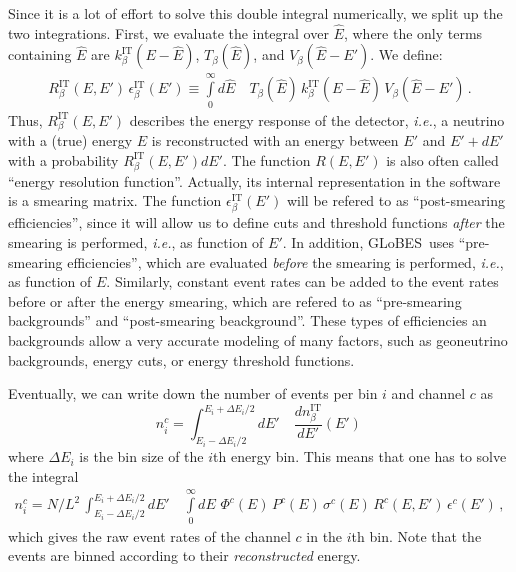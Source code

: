 \documentclass[12pt,a4paper]{article}
\newcommand{\ie}{{\it i.e.}}
\newcommand{\GLOBES}{{\sf GLoBES}}
\begin{document}
Since it is a lot of effort to solve this double integral numerically,
we split up the two integrations. First, we evaluate the integral over
$\hat{E}$, where the only terms containing $\hat{E}$ are
$k_\beta^{\text{IT}}(E-\hat{E})$,  $ T_\beta(\hat{E})$, and 
$ V_\beta(\hat{E}-E')$. We define:
\begin{eqnarray}
\label{equ:e_res} 
R_\beta^{\text{IT}}(E,E')\,\epsilon_\beta^{\text{IT}}(E')
 \equiv
\int\limits_0^\infty d\hat{E} \quad T_\beta(\hat{E})\,k_\beta^{\text{IT}}(E-\hat{E})
\,V_\beta(\hat{E}-E')\,. 
\end{eqnarray}
Thus, $R_\beta^{\text{IT}}(E,E')$ describes the energy response of 
the detector, \ie , a neutrino with a (true) energy $E$ is reconstructed
with an energy between $E'$ and $E'+dE'$ with a probability
$R_\beta^{\text{IT}}(E,E') dE'$. The function $R(E,E')$ is also often called ``energy resolution function''. Actually, its internal representation
in the software is a smearing matrix. The function $\epsilon_\beta^{\text{IT}}(E')$ will be refered to as ``post-smearing efficiencies'', since it will allow us to define cuts and threshold functions {\em after} the smearing is performed, \ie, as function of $E'$. 
In addition, \GLOBES\ uses ``pre-smearing efficiencies'', which are 
evaluated {\em before} the smearing is performed, \ie, as function of $E$.
Similarly, constant event rates can be added to the event rates before or after the energy smearing, which are refered to as ``pre-smearing backgrounds'' and ``post-smearing beackground''. These types of 
efficiencies an backgrounds allow a very accurate modeling of
many factors, such as geoneutrino backgrounds, energy cuts, or
energy threshold functions.

Eventually, we can write down the number of events per bin $i$  and channel $c$ as
\begin{equation}
\label{equ:channel}
n_i^c=\int_{E_i-\Delta E_i/2}^{E_i+\Delta E_i/2} dE' \quad
\frac{dn_{\beta}^{\text{IT}}}{dE'} (E') \,
\end{equation}
where $\Delta E_i$ is the bin size of the $i$th energy bin.
This means that one has to solve the integral
\begin{eqnarray}
\label{equ:events_bin}
n_i^c=N/L^2\,\int_{E_i-\Delta E_i/2}^{E_i+\Delta E_i/2} dE' 
\quad \int\limits_0^\infty dE \,\, \Phi^c(E)\,
P^c(E)\,
\sigma^c(E)\,
R^c(E,E')\,
\epsilon^c(E')\,,
\end{eqnarray} 
which gives the raw event rates of the channel $c$ in the $i$th bin.
Note that the events are binned according to their \emph{reconstructed} energy.
\end{document}
